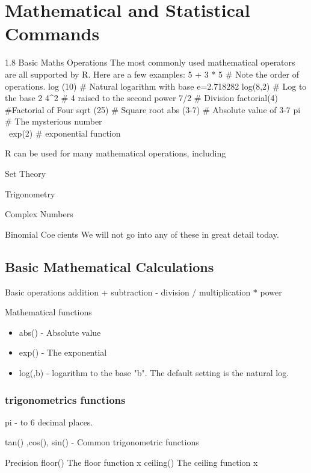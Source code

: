 \documentclass[a4paper,12pt]{article}
\begin{document}
\tableofcontents
\section{Mathematical and Statistical Commands}
1.8 Basic Maths Operations
The most commonly used mathematical operators are all supported by R. Here are a few
examples:
5 + 3 * 5 # Note the order of operations.
log (10) # Natural logarithm with base e=2.718282
log(8,2) # Log to the base 2
4^2 # 4 raised to the second power
7/2 # Division
factorial(4) #Factorial of Four
sqrt (25) # Square root
abs (3-7) # Absolute value of 3-7
pi # The mysterious number \\\
exp(2) # exponential function

R can be used for many mathematical operations, including
\item Set Theory
\item Trigonometry
\item Complex Numbers
\item Binomial Coecients
We will not go into any of these in great detail today.

\subsection{Basic Mathematical Calculations}
Basic operations
addition  +      
subtraction    	-
division   /     
multiplication   $\ast$
power     


Mathematical functions
\begin{itemize}
\item abs()       - Absolute value 
\item exp()	   - The exponential
\item log(,b)     - logarithm to the base "b". The default setting is the natural log.
\end{itemize}
\subsubsection*{trigonometrics functions}

pi            -  to 6 decimal places.

tan() ,cos(), sin()   - Common trigonometric functions

 
 Precision
 floor() 	  The floor function 		x
 ceiling()    The ceiling function       x
\end{document}

